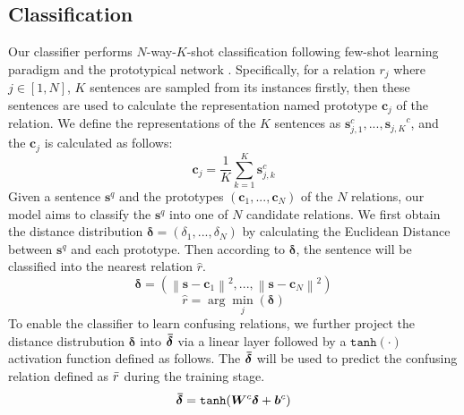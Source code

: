 \documentclass[11pt]{article}
\begin{document}
\subsection{Classification}
Our classifier performs $N$-way-$K$-shot classification following few-shot learning paradigm and the prototypical network \cite{snell2017prototypical}. Specifically,
for a relation $r_j$ where $j \in [1,N]$, $K$ sentences are sampled from its instances firstly, then these sentences are used to calculate the representation named prototype $\bm c_j$ of the relation. We define the representations of the $K$ sentences as ${\bm s_{j,1}^{c},...,\bm s_{j,K}}^{c}$, and the $\bm c_j$ is calculated as follows:
\begin{equation}
\bm c_j=\frac{1}{K}\sum_{k=1}^{K}\bm s_{j,k}^{c}
\end{equation}
Given a sentence $\bm s^{q}$ and the prototypes $(\bm c_1,...,\bm c_N)$ of the $N$ relations, our model aims to classify the $\bm s^{q}$ into one of $N$ candidate relations.
We first obtain the distance distribution $\bm \delta=(\delta_{1},...,\delta_{N})$ by calculating the Euclidean Distance between $\bm s^q$ and each prototype. Then according to $\bm \delta$, the sentence will be classified into the nearest relation $\hat{r}$.
\begin{equation}
\bm{\delta} =({\left \|\bm s-\bm c_1 \right\|^2,...,\left \|\bm s-\bm c_N \right\|^2})
\end{equation}
\begin{equation}
\hat{r}=\arg\min_j{(\bm{\delta})}
\end{equation}
To enable the classifier to learn confusing relations, we further project the distance distrubution $\bm \delta$ into $\bm {\Bar{\delta}}$ via a linear layer followed by a $\mathtt{tanh}(\cdot)$ activation function defined as follows. The $\bm {\Bar{\delta}}$ will be used to predict the confusing relation defined as $\Bar{r}$ during the training stage.
\begin{equation}
\bm {\Bar{\delta}} = \mathtt{tanh}(\bm W^{c} \bm \delta + \bm b^{c})
\end{equation}
\end{document}
